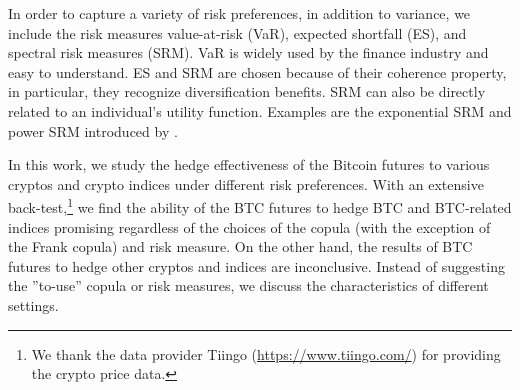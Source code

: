 \documentclass[11pt,a4paper,english]{article}
\providecommand{\natp}[1]{\textcolor{darkorange}{#1}}
\begin{document}
In order to capture a variety of risk preferences, in addition to
variance, we include the risk measures value-at-risk (VaR), expected
shortfall (ES), and spectral risk measures (SRM). 
VaR is widely used by the finance industry and easy to understand. 
ES and SRM are chosen because of their coherence property, in
particular, they recognize diversification benefits.
SRM can also be directly related to an individual's utility function.
Examples are the exponential SRM and power SRM introduced by
\citet{dowd2008spectral}. \medskip

%

In this work, we study the hedge effectiveness of the Bitcoin futures
to various cryptos and crypto indices under different risk
preferences. 
With an extensive back-test,\footnote{We thank the data provider
  Tiingo (\href{https://www.tiingo.com/}{https://www.tiingo.com/}) for
  providing the crypto price data.}
 we find the ability of the BTC futures to hedge BTC and BTC-related
 indices promising regardless of the choices of the copula (with the
 exception of the Frank copula) and risk measure. 
On the other hand, the results of BTC futures to hedge other cryptos and indices are inconclusive.
Instead of suggesting the ''to-use'' copula or risk measures, we discuss the characteristics of different settings. \medskip
\end{document}
